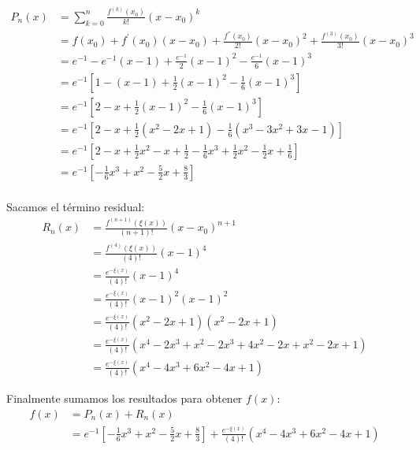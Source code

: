 \documentclass[12pt]{article}
\begin{document}
\[
    \begin{aligned}
        P_n(x) &= \sum_{k = 0}^{n} \frac{f^{(k)}(x_0)}{k!} (x - x_0)^{k} \\
               &= f(x_0) + f^{'}(x_0) (x-x_0) + \frac{f^{''}(x_0)}{2!} (x - x_0)^{2} + \frac{f^{(3)}(x_0)}{3!} (x - x_0)^{3} \\  
               &= e^{-1} - e^{-1} (x-1) + \frac{e^{-1}}{2} (x-1)^{2} - \frac{e^{-1}}{6} (x - 1)^{3} \\
               &= e^{-1}\left[ 1 - (x-1) + \frac{1}{2} (x -1)^{2} - \frac{1}{6} (x -1)^{3}  \right] \\
               &= e^{-1}\left[ 2 - x + \frac{1}{2} (x -1)^{2} - \frac{1}{6} (x -1)^{3}  \right] \\
               &= e^{-1}\left[ 2 - x + \frac{1}{2} (x^{2} -2x +1) - \frac{1}{6} (x^{3} -3x^{2} + 3x - 1)  \right] \\
               &= e^{-1}\left[ 2 - x +  \frac{1}{2}x^{2} -x +\frac{1}{2} -  \frac{1}{6}x^{3} +\frac{1}{2}x^{2} -\frac{1}{2} x +\frac{1}{6}   \right] \\
               &= e^{-1}\left[  -  \frac{1}{6}x^{3} + x^{2} - \frac{5}{2}x   + \frac{8}{3}   \right] \\
    \end{aligned}
\]

Sacamos el término residual:
\[
    \begin{aligned}
        R_n (x) &= \frac{f^{(n+1)}(\xi(x))}{(n+1)!} (x - x_0)^{n+1} \\
                &= \frac{f^{(4)}(\xi(x))}{(4)!} (x - 1)^{4} \\
                &= \frac{e^{- \xi (x)}}{(4)!} (x - 1)^{4} \\
                &= \frac{e^{- \xi (x)}}{(4)!} (x-1)^{2} (x-1)^{2} \\
                &= \frac{e^{- \xi (x)}}{(4)!} (x^{2}-2x+1) (x^{2}-2x+1) \\
                &= \frac{e^{- \xi (x)}}{(4)!} (x^{4} -2x^{3} +x^{2} -2x^{3} + 4x^{2} -2x +  x^{2}-2x+1)\\
                &= \frac{e^{- \xi (x)}}{(4)!} (x^{4} -4x^{3} + 6x^{2} -4x +1) 
    \end{aligned}
\]

Finalmente sumamos los resultados para obtener \(f(x)\):
\[
    \begin{aligned}
    f(x) &= P_n(x) + R_n(x)\\
         &= e^{-1}\left[  -  \frac{1}{6}x^{3} + x^{2} - \frac{5}{2}x   + \frac{8}{3}   \right]+\frac{e^{- \xi (x)}}{(4)!} (x^{4} -4x^{3} + 6x^{2} -4x +1) \\
    \end{aligned}
\]
\end{document}
